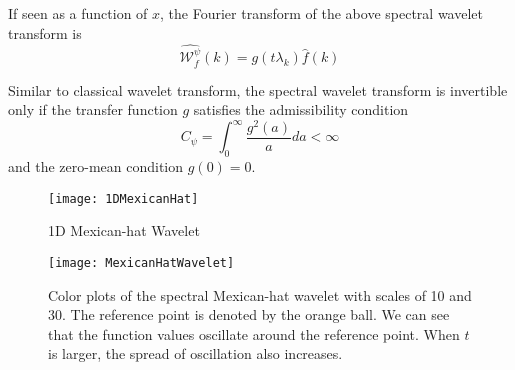 If seen as a function of $x$, the Fourier transform of the above spectral wavelet transform is
\begin{equation}
\widehat{\mathcal{W}^\psi_f}(k)=g(t\lambda_k)\hat{f}(k)
\end{equation}

Similar to classical wavelet transform, the spectral wavelet transform is invertible only if the transfer function $g$ satisfies the admissibility condition
\begin{equation}
C_\psi=\int_0^\infty\frac{g^2(a)}{a}da<\infty
\end{equation}
and the zero-mean condition $g(0)=0$.



\begin{figure}
  \centering
  \texttt{[image: 1DMexicanHat]}\\
  \caption{1D Mexican-hat Wavelet}
  \label{fg:1DMexicanHat}
\end{figure}

\begin{figure}
  \centering
  \texttt{[image: MexicanHatWavelet]}\\
  \caption[Visualizations of the spectral Mexican-hat wavelets.]
  {Color plots of the spectral Mexican-hat wavelet with scales of 10 and 30. The reference point is denoted by the orange ball.
  We can see that the function values oscillate around the reference point.
  When $t$ is larger, the spread of oscillation also increases.}
  \label{fg:MexicanHatWavelet}
\end{figure}

